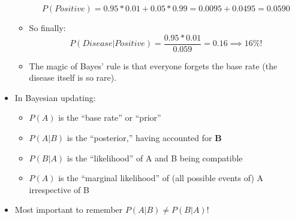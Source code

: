\documentclass{article}
\begin{document}
\begin{itemize}
\begin{itemize}
		\begin{equation*}
		P(Positive)=0.95*0.01+0.05*0.99=0.0095+0.0495=0.0590	
		\end{equation*}
		\item So finally: 
		\begin{equation*}
		P(Disease|Positive)=\frac{0.95*0.01}{0.059}=0.16	\implies 16\%! 
		\end{equation*}
		\item The magic of Bayes' rule is that everyone forgets the base rate (the disease itself is so rare). 
	\end{itemize}
	\item In Bayesian updating: 
	\begin{itemize}
          \item $P(A)$ is the ``base rate'' or ``prior''
          \item $P(A|B)$ is the ``posterior,'' having accounted for $\textbf{B}$
          \item $P(B|A)$ is the ``likelihood'' of A and B being compatible
          \item $P(A)$ is the ``marginal likelihood'' of (all possible events of) A irrespective of B
     \end{itemize}
     \item Most important to remember $P(A|B) \neq P(B|A)$! 
\end{itemize}
\end{document}
